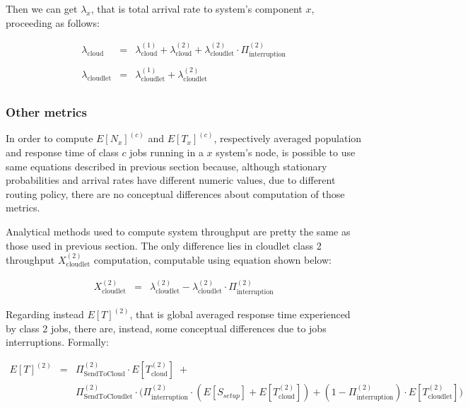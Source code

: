 \documentclass[10pt,a4paper]{article}
\begin{document}
Then we can get $\lambda_x$, that is total arrival rate to system's component $x$, proceeding as follows:

\begin{equation}
\begin{array} {rcl}

\lambda_{\text{cloud}} & = & \lambda_{\text{cloud}}^{(1)} + \lambda_{\text{cloud}}^{(2)} + \lambda_{\text{cloudlet}}^{(2)} \cdot \Pi_{\text{interruption}}^{(2)} \\\\

\lambda_{\text{cloudlet}} & = & \lambda_{\text{cloudlet}}^{(1)} + \lambda_{\text{cloudlet}}^{(2)} \\
\end{array}
\end{equation}

\subsubsection{Other metrics}

In order to compute $E[N_x]^{(c)}$ and $E[T_x]^{(c)}$, respectively averaged population and response time of class $c$ jobs running in a $x$ system's node, is possible to use same equations described in previous section because, although stationary probabilities and arrival rates have different numeric values, due to different routing policy, there are no conceptual differences about computation of those metrics.

Analytical methods used to compute system throughput are pretty the same as those used in previous section. The only difference lies in cloudlet class 2 throughput  $X_{\text{cloudlet}}^{(2)}$ computation, computable using equation shown below:

\begin{equation}
\begin{array} {lcl} 
X_{\text{cloudlet}}^{(2)} & = & \lambda_{\text{cloudlet}}^{(2)} - \lambda_{\text{cloudlet}}^{(2)} \cdot \Pi_{\text{interruption}}^{(2)}
\end{array}
\end{equation}

Regarding instead $E[T]^{(2)}$, that is global averaged response time experienced by class 2 jobs, there are, instead, some conceptual differences due to jobs interruptions. Formally:


\begin{equation}
\begin{array} {lcl} 
E[T]^{(2)}  & = & \Pi_{\text{SendToCloud}}^{(2)} \cdot E[T_{\text{cloud}}^{(2)}] \; +  \\
& & \Pi_{\text{SendToCloudlet}}^{(2)} \cdot \bigg( \Pi_{\text{interruption}}^{(2)}\cdot(E[S_{setup}] + E[T_{\text{cloud}}^{(2)}]) + (1-\Pi_{\text{interruption}}^{(2)}) \cdot E[T_{\text{cloudlet}}^{(2)}] \bigg)
\end{array}
\end{equation}
\end{document}
